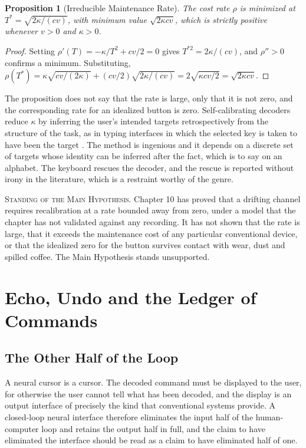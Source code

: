 \documentclass[11pt,twoside,openany]{book}
\newtheorem{proposition}[theorem]{Proposition}
\theoremstyle{definition}
\theoremstyle{remark}
\newenvironment{standing}{\par\medskip\noindent\hrulefill\par\smallskip\noindent\textsc{Standing of the Main Hypothesis.}\enspace}{\par\smallskip\noindent\hrulefill\par\medskip}
\begin{document}
\begin{proposition}[Irreducible Maintenance Rate]\label{prop:maint}
The cost rate $\rho$ is minimized at $T^{*}=\sqrt{2\kappa/(c v)}$, with minimum value $\sqrt{2\kappa c v}$, which is strictly positive whenever $v>0$ and $\kappa>0$.
\end{proposition}
\begin{proof}
Setting $\rho'(T)=-\kappa/T^{2}+cv/2=0$ gives $T^{*2}=2\kappa/(cv)$, and $\rho''>0$ confirms a minimum. Substituting, $\rho(T^{*})=\kappa\sqrt{cv/(2\kappa)}+(cv/2)\sqrt{2\kappa/(cv)}=2\sqrt{\kappa cv/2}=\sqrt{2\kappa cv}$.
\end{proof}

The proposition does not say that the rate is large, only that it is not zero, and the corresponding rate for an idealized button is zero. Self-calibrating decoders reduce $\kappa$ by inferring the user's intended targets retrospectively from the structure of the task, as in typing interfaces in which the selected key is taken to have been the target \cite{jarosiewicz2015}. The method is ingenious and it depends on a discrete set of targets whose identity can be inferred after the fact, which is to say on an alphabet. The keyboard rescues the decoder, and the rescue is reported without irony in the literature, which is a restraint worthy of the genre.

\begin{standing}
Chapter 10 has proved that a drifting channel requires recalibration at a rate bounded away from zero, under a model that the chapter has not validated against any recording. It has not shown that the rate is large, that it exceeds the maintenance cost of any particular conventional device, or that the idealized zero for the button survives contact with wear, dust and spilled coffee. The Main Hypothesis stands unsupported.
\end{standing}

\chapter{Echo, Undo and the Ledger of Commands}

\section{The Other Half of the Loop}

A neural cursor is a cursor. The decoded command must be displayed to the user, for otherwise the user cannot tell what has been decoded, and the display is an output interface of precisely the kind that conventional systems provide. A closed-loop neural interface therefore eliminates the input half of the human-computer loop and retains the output half in full, and the claim to have eliminated the interface should be read as a claim to have eliminated half of one.
\end{document}
